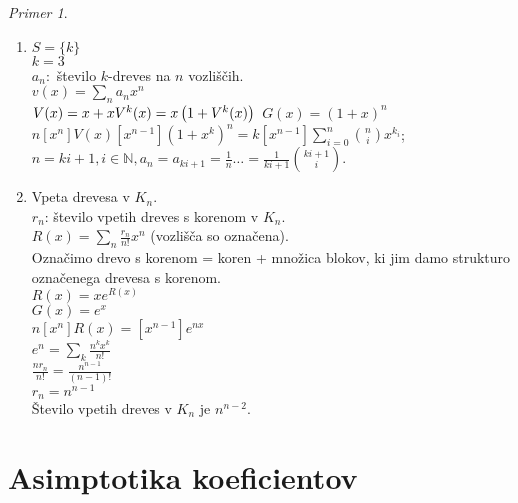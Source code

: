 \documentclass[a4paper, 12pt]{book}
\theoremstyle{definition}
\theoremstyle{remark}
\newtheorem*{ex}{Primer}
\newcommand{\N}{\mathbb{N}}
\begin{document}
\begin{ex} \text{} \\
  \begin{enumerate}[label=(\alph*)]
    \item $S = \{k\}$ \\
      $k = 3$ \\
      $a_n:$ število $k$-dreves na $n$ vozliščih. \\
      $v(x) = \sum_n a_n x^n$ \\
      $V(x) = x + x V^k(x) = x \left(1 + V^k(x)\right) \\$
      $G(x) = (1+x)^n$ \\
      $n [x^n] V(x) [x^{n-1}] \left(1 + x^k\right)^n = k [x^{n-1}] \sum_{i=0}^{n} \binom{n}{i} x^{k_i}$; \\
      $n = ki + 1, i \in \N, a_n = a_{ki+1} = \frac{1}{n} \dots = \frac{1}{ki+1} \binom{ki+1}{i}$.
    \item Vpeta drevesa v $K_n$. \\
      $r_n$: število vpetih dreves s korenom v $K_n$. \\
      $R(x) = \sum_n \frac{r_n}{n!} x^n$ (vozlišča so označena). \\
      Označimo drevo s korenom = koren + množica blokov, ki jim damo strukturo označenega drevesa s korenom. \\
      $R(x) = x e^{R(x)}$ \\
      $G(x) = e^x$ \\
      $n [x^n] R(x) = [x^{n-1}] e^{nx}$ \\
      $e^n = \sum_k \frac{n^k x^k}{n!}$ \\
      $\frac{n r_n}{n!} = \frac{n^{n-1}}{(n-1)!}$ \\
      $r_n = n^{n-1}$ \\
      Število vpetih dreves v $K_n$ je $n^{n-2}$. 
  \end{enumerate}
\end{ex}


\section{Asimptotika koeficientov}
\end{document}
